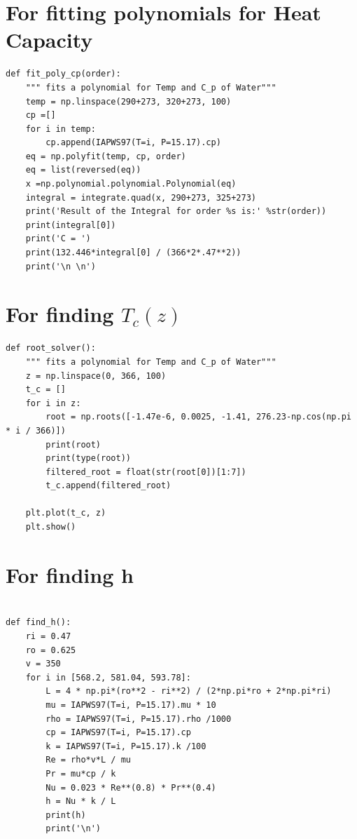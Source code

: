 \documentclass[12pt,letterpaper]{article}
\begin{document}
\begin{appendices}

\section{For fitting polynomials for Heat Capacity}

\begin{verbatim}
def fit_poly_cp(order):
    """ fits a polynomial for Temp and C_p of Water"""
    temp = np.linspace(290+273, 320+273, 100)
    cp =[]
    for i in temp:
        cp.append(IAPWS97(T=i, P=15.17).cp)
    eq = np.polyfit(temp, cp, order)
    eq = list(reversed(eq))
    x =np.polynomial.polynomial.Polynomial(eq)
    integral = integrate.quad(x, 290+273, 325+273)
    print('Result of the Integral for order %s is:' %str(order))
    print(integral[0])
    print('C = ')
    print(132.446*integral[0] / (366*2*.47**2))
    print('\n \n')
\end{verbatim}

\section{For finding $T_c(z)$}

\begin{verbatim}
def root_solver():
    """ fits a polynomial for Temp and C_p of Water"""
    z = np.linspace(0, 366, 100)
    t_c = []
    for i in z:
        root = np.roots([-1.47e-6, 0.0025, -1.41, 276.23-np.cos(np.pi * i / 366)])
        print(root)
        print(type(root))
        filtered_root = float(str(root[0])[1:7])
        t_c.append(filtered_root)

    plt.plot(t_c, z)
    plt.show()
\end{verbatim}

\section{For finding h}

\begin{verbatim}

def find_h():
    ri = 0.47
    ro = 0.625
    v = 350
    for i in [568.2, 581.04, 593.78]:
        L = 4 * np.pi*(ro**2 - ri**2) / (2*np.pi*ro + 2*np.pi*ri)
        mu = IAPWS97(T=i, P=15.17).mu * 10
        rho = IAPWS97(T=i, P=15.17).rho /1000
        cp = IAPWS97(T=i, P=15.17).cp
        k = IAPWS97(T=i, P=15.17).k /100
        Re = rho*v*L / mu
        Pr = mu*cp / k
        Nu = 0.023 * Re**(0.8) * Pr**(0.4)
        h = Nu * k / L
        print(h)
        print('\n')
\end{verbatim}


\end{appendices}
\end{document}
